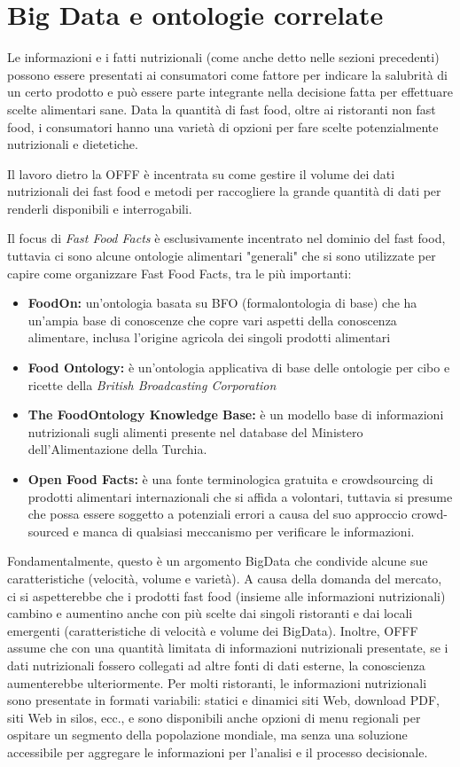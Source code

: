 \section{Big Data e ontologie correlate}

Le informazioni e i fatti nutrizionali (come anche detto nelle sezioni precedenti) possono essere presentati ai consumatori come fattore per indicare la salubrità di un certo prodotto e può essere parte integrante nella decisione fatta per effettuare scelte alimentari sane. 
Data la quantità di fast food, oltre ai ristoranti non fast food, i consumatori hanno una varietà di opzioni per fare scelte potenzialmente nutrizionali e dietetiche. 

Il lavoro dietro la OFFF è incentrata su come gestire il volume dei dati nutrizionali dei fast food e metodi per raccogliere la grande quantità di dati per renderli disponibili e interrogabili. 

Il focus di \emph{Fast Food Facts} è esclusivamente incentrato nel dominio del fast food, tuttavia ci sono alcune ontologie alimentari "generali" che si sono utilizzate per capire come organizzare Fast Food Facts, tra le più importanti:
\begin{itemize}
    \item \textbf{FoodOn:} un'ontologia basata su BFO (formalontologia di base) che ha un'ampia base di conoscenze che copre vari aspetti della conoscenza alimentare, inclusa l'origine agricola dei singoli prodotti alimentari
    \item \textbf{Food Ontology:} è un'ontologia applicativa di base delle ontologie per cibo e ricette della \emph{British Broadcasting Corporation}
    \item \textbf{The FoodOntology Knowledge Base:} è un modello base di informazioni nutrizionali sugli alimenti presente nel database del Ministero dell'Alimentazione della Turchia.
    \item \textbf{Open Food Facts:} è una fonte terminologica gratuita e crowdsourcing di prodotti alimentari internazionali che si affida a volontari, tuttavia si presume che possa essere soggetto a potenziali errori a causa del suo approccio crowd-sourced e manca di qualsiasi meccanismo per verificare le informazioni.
\end{itemize}

Fondamentalmente, questo è un argomento BigData che condivide alcune sue caratteristiche (velocità, volume e varietà). A causa della domanda del mercato, ci si aspetterebbe che i prodotti fast food (insieme alle informazioni nutrizionali) cambino e aumentino anche con più scelte dai singoli ristoranti e dai locali emergenti (caratteristiche di velocità e volume dei BigData). 
Inoltre, OFFF assume che con una quantità limitata di informazioni nutrizionali presentate, se i dati nutrizionali fossero collegati ad altre fonti di dati esterne, la conoscienza aumenterebbe ulteriormente. Per molti ristoranti, le informazioni nutrizionali sono presentate in formati variabili: statici e dinamici siti Web, download PDF, siti Web in silos, ecc., e sono disponibili anche opzioni di menu regionali per ospitare un segmento della popolazione mondiale, ma senza una soluzione accessibile per aggregare le informazioni per l'analisi e il processo decisionale. 

